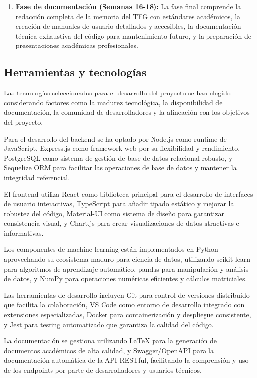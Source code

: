 \begin{enumerate}
    \item \textbf{Fase de documentación (Semanas 16-18):} La fase final comprende la redacción completa de la memoria del TFG con estándares académicos, la creación de manuales de usuario detallados y accesibles, la documentación técnica exhaustiva del código para mantenimiento futuro, y la preparación de presentaciones académicas profesionales.
\end{enumerate}

\subsection{Herramientas y tecnologías}

Las tecnologías seleccionadas para el desarrollo del proyecto se han elegido considerando factores como la madurez tecnológica, la disponibilidad de documentación, la comunidad de desarrolladores y la alineación con los objetivos del proyecto.

Para el desarrollo del backend se ha optado por Node.js como runtime de JavaScript, Express.js como framework web por su flexibilidad y rendimiento, PostgreSQL como sistema de gestión de base de datos relacional robusto, y Sequelize ORM para facilitar las operaciones de base de datos y mantener la integridad referencial.

El frontend utiliza React como biblioteca principal para el desarrollo de interfaces de usuario interactivas, TypeScript para añadir tipado estático y mejorar la robustez del código, Material-UI como sistema de diseño para garantizar consistencia visual, y Chart.js para crear visualizaciones de datos atractivas e informativas.

Los componentes de machine learning están implementados en Python aprovechando su ecosistema maduro para ciencia de datos, utilizando scikit-learn para algoritmos de aprendizaje automático, pandas para manipulación y análisis de datos, y NumPy para operaciones numéricas eficientes y cálculos matriciales.

Las herramientas de desarrollo incluyen Git para control de versiones distribuido que facilita la colaboración, VS Code como entorno de desarrollo integrado con extensiones especializadas, Docker para containerización y despliegue consistente, y Jest para testing automatizado que garantiza la calidad del código.

La documentación se gestiona utilizando LaTeX para la generación de documentos académicos de alta calidad, y Swagger/OpenAPI para la documentación automática de la API RESTful, facilitando la comprensión y uso de los endpoints por parte de desarrolladores y usuarios técnicos.

